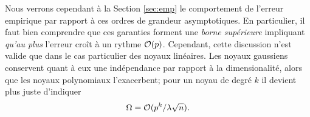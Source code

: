 Nous verrons cependant à la Section \ref{sec:emp} le comportement de l'erreur empirique
par rapport à ces ordres de grandeur asymptotiques. En particulier, il faut bien
comprendre que ces garanties forment une \textit{borne supérieure} impliquant \textit{qu'au plus}
l'erreur croît à un rythme $\mathcal O(p)$. 
Cependant, cette discussion n'est valide que dans le cas particulier des noyaux
linéaires. Les noyaux gaussiens conservent quant à eux une indépendance par rapport à la
dimensionalité, alors que les noyaux polynomiaux l'exacerbent; pour un noyau de degré $k$
il devient plus juste d'indiquer
\begin{equation}
  \Omega = \mathcal O(p^k/\lambda\sqrt{n}).
\end{equation}







